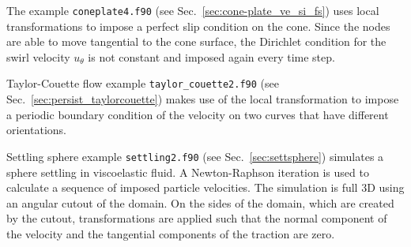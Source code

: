 The example \texttt{coneplate4.f90} (see Sec.~\ref{sec:cone-plate_ve_si_fs}) uses local transformations to impose a perfect slip condition on the cone. Since the nodes are able to move tangential to the cone surface, the Dirichlet condition for the swirl velocity $u_\theta$ is not constant and imposed again every time step.

Taylor-Couette flow example \texttt{taylor\_couette2.f90}
(see Sec.~\ref{sec:persist_taylorcouette})
makes use of the local transformation to impose
a periodic boundary condition of the velocity on two curves
that have different orientations.

Settling sphere example \texttt{settling2.f90} (see Sec.~\ref{sec:settsphere}) simulates a sphere settling 
in viscoelastic fluid.
A Newton-Raphson iteration is used to calculate a sequence of imposed particle 
velocities. The simulation is full 3D using an angular cutout of the domain. On 
the sides of the domain, which are created by the cutout, transformations are applied such that 
the normal component of the velocity and the tangential components of the traction are zero.
